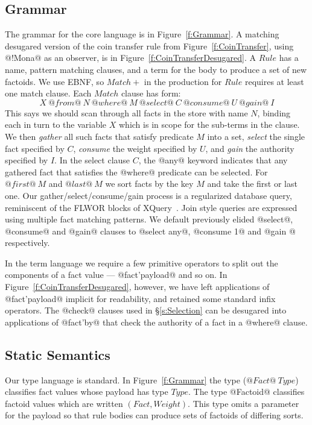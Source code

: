 \subsection{Grammar}
The grammar for the core language is in Figure~\ref{f:Grammar}. A matching desugared version of the coin transfer rule from Figure~\ref{f:CoinTransfer}, using @!Mona@ as an observer, is in Figure~\ref{f:CoinTransferDesugared}.
A $Rule$ has a name, pattern matching clauses, and a term for the body to produce a set of new factoids. We use EBNF, so $Match+$ in the production for $Rule$ requires at least one match clause. Each $Match$ clause has form:
$$
X~ @from@~ N~ @where@~ M~ @select@~ C~ @consume@~ U~ @gain@~ I
$$
This says we should scan through all facts in the store with name $N$, binding each in turn to the variable $X$ which is in scope for the sub-terms in the clause. We then \emph{gather} all such facts that satisfy predicate $M$ into a set, \emph{select} the single fact specified by $C$, \emph{consume} the weight specified by $U$, and \emph{gain} the authority specified by $I$. In the select clause $C$, the @any@ keyword indicates that any gathered fact that satisfies the @where@ predicate can be selected. For $@first@~ M$ and $@last@~ M$ we sort facts by the key $M$ and take the first or last one. Our gather/select/consume/gain process is a regularized database query, reminiscent of the FLWOR blocks of XQuery~\cite{Boag2002:XQuery}. Join style queries are expressed using multiple fact matching patterns. We default previously elided @select@, @consume@ and @gain@ clauses to @select any@, @consume 1@ and @gain {}@ respectively.

In the term language we require a few primitive operators to split out the components of a fact value --- @fact'payload@ and so on. In Figure~\ref{f:CoinTransferDesugared}, however, we have left applications of @fact'payload@ implicit for readability, and retained some standard infix operators. The @check@ clauses used in \S\ref{s:Selection} can be desugared into applications of @fact'by@ that check the authority of a fact in a @where@ clause.


\eject{}
\subsection{Static Semantics}
Our type language is standard. In Figure~\ref{f:Grammar} the type ($@Fact@~ Type$) classifies fact values whose payload has type $Type$. The type @Factoid@ classifies factoid values which are written $(Fact, Weight)$. This type omits a parameter for the payload so that rule bodies can produce sets of factoids of differing sorts.

